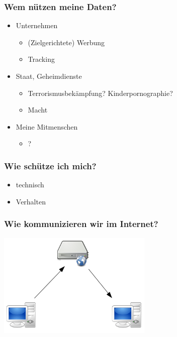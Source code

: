 \documentclass[12pt]{beamer}
\begin{document}
\begin{frame}
    \frametitle{Wem nützen meine Daten?}
    \begin{itemize}
      \item<2-> Unternehmen
        \begin{itemize}
          \item<3-> (Zielgerichtete) Werbung
          \item<4-> Tracking
        \end{itemize}
      \item<5-> Staat, Geheimdienste
        \begin{itemize}
          \item<6-> Terrorismusbekämpfung? Kinderpornographie?
          \item<7-> Macht
        \end{itemize}
      \item<8->Meine Mitmenschen
        \begin{itemize}
          \item<9-> ?
      \end{itemize}
    \end{itemize}
\end{frame}

\begin{frame}
    \frametitle{Wie schütze ich mich?}
    \begin{itemize}
      \item<1-> technisch
      \item<2-> Verhalten
    \end{itemize}
\end{frame}

\begin{frame}
    \frametitle{Wie kommunizieren wir im Internet?}
    \begin{center}
      \includegraphics[height=5cm]{img/c-s.png}
    \end{center}
\end{frame}
\end{document}
